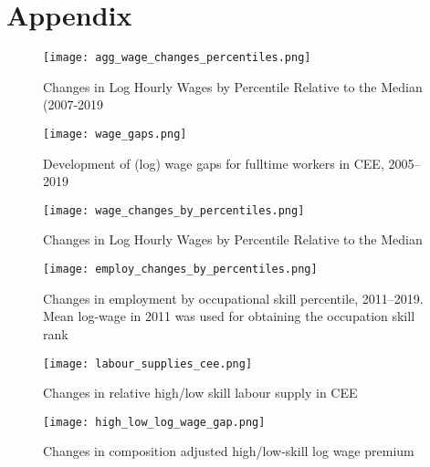 \documentclass{article}
\begin{document}
\newpage

\section{Appendix}

\begin{figure}[!htbp]%
    \centering
    {\texttt{[image: agg\_wage\_changes\_percentiles.png]} }
    \caption{Changes in Log Hourly Wages by Percentile Relative to the Median (2007-2019}
    \label{agg_wage_changes_percentiles}
\end{figure}




\begin{figure}[!htbp]%
    \centering
    {\texttt{[image: wage\_gaps.png]} }
    \caption{Development of (log) wage gaps for fulltime workers in CEE, 2005–2019}
    \label{wage_gaps_CEE}
\end{figure}

\begin{figure}[!htbp]%
    \centering
    {\texttt{[image: wage\_changes\_by\_percentiles.png]} }
    \caption{Changes in Log Hourly Wages by Percentile Relative to the Median}
    \label{wage_changes_percentiles}
\end{figure}

\begin{figure}[!htbp]%
    \centering
    {\texttt{[image: employ\_changes\_by\_percentiles.png]} }
    \caption{Changes in employment by occupational skill percentile, 2011–2019. Mean log-wage in 2011 was used for obtaining the occupation skill rank}
    \label{employ_changes_percentiles}
\end{figure}

\begin{figure}[!htbp]%
        \centering 
        {\texttt{[image: labour\_supplies\_cee.png]}}
        \caption{Changes in relative high/low skill labour supply in CEE}
        \label{labour_supplies_cee}
\end{figure}

\begin{figure}[!htbp]%
    \centering 
    {\texttt{[image: high\_low\_log\_wage\_gap.png]}}
    \caption{Changes in composition adjusted high/low-skill log wage premium}
    \label{high_low_log_wage_gap}
\end{figure}
\end{document}
